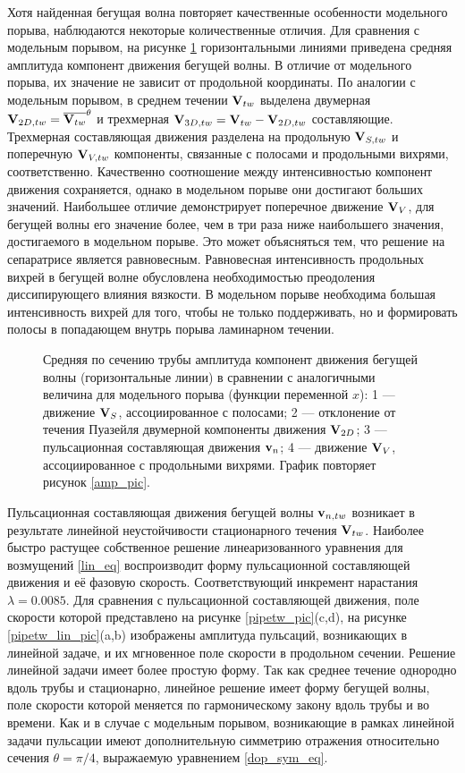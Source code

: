 Хотя найденная бегущая волна повторяет качественные особенности модельного порыва, наблюдаются некоторые количественные отличия. Для сравнения с модельным порывом, на рисунке \ref{pipetw_amp_pic} горизонтальными линиями приведена средняя амплитуда компонент движения бегущей волны. В отличие от модельного порыва, их значение не зависит от продольной координаты. По аналогии с модельным порывом, в среднем течении $\mathbf{V}_{tw}$ выделена двумерная $\mathbf{V}_{2D,tw} = \overline{\mathbf{V}_{tw}}^\theta$ и трехмерная  $\mathbf{V}_{3D,tw} = \mathbf{V}_{tw} - \mathbf{V}_{2D,tw}$ составляющие. Трехмерная составляющая движения разделена на продольную $\mathbf{V}_{S,tw}$ и поперечную $\mathbf{V}_{V,tw}$ компоненты, связанные с полосами и продольными вихрями, соответственно. Качественно соотношение между интенсивностью компонент движения сохраняется, однако в модельном порыве они достигают больших значений. Наибольшее отличие демонстрирует поперечное движение $\mathbf{V}_V$, для бегущей волны его значение более, чем в три раза ниже наибольшего значения, достигаемого в модельном порыве. Это может объясняться тем, что решение на сепаратрисе является равновесным. Равновесная интенсивность продольных вихрей в бегущей волне обусловлена необходимостью преодоления диссипирующего влияния вязкости. В модельном порыве необходима большая интенсивность вихрей для того, чтобы не только поддерживать, но и формировать полосы в попадающем внутрь порыва ламинарном течении. 


\begin{figure}
\caption{Средняя по сечению трубы амплитуда компонент движения бегущей волны (горизонтальные линии) в сравнении с аналогичными величина для модельного порыва (функции переменной $x$): 1 --- движение $\mathbf{V}_S$, ассоциированное с полосами; 2 --- отклонение от течения Пуазейля двумерной компоненты движения $\mathbf{V}_{2D}$; 3 --- пульсационная составляющая движения $\mathbf{v}_n$; 4 --- движение $\mathbf{V}_V$, ассоциированное с продольными вихрями. График повторяет рисунок \ref{amp_pic}.}
\label{pipetw_amp_pic}
\end{figure}

Пульсационная составляющая движения бегущей волны $\mathbf{v}_{n,tw}$ возникает в результате линейной неустойчивости стационарного течения $\mathbf{V}_{tw}$. Наиболее быстро растущее собственное решение линеаризованного уравнения для возмущений \eqref{lin_eq} воспроизводит форму пульсационной составляющей движения и её фазовую скорость. Соответствующий инкремент нарастания $\lambda = 0.0085$. Для сравнения с пульсационной составляющей движения, поле скорости которой представлено на рисунке \ref{pipetw_pic}(c,d), на рисунке \ref{pipetw_lin_pic}(a,b) изображены амплитуда пульсаций, возникающих в линейной задаче, и их мгновенное поле скорости в продольном сечении. Решение линейной задачи имеет более простую форму. Так как среднее течение однородно вдоль трубы и стационарно, линейное решение имеет форму бегущей волны, поле скорости которой меняется по гармоническому закону вдоль трубы и во времени. Как и в случае с модельным порывом, возникающие в рамках линейной задачи пульсации имеют дополнительную симметрию отражения относительно сечения $\theta = \pi/4$, выражаемую уравнением \eqref{dop_sym_eq}. 


